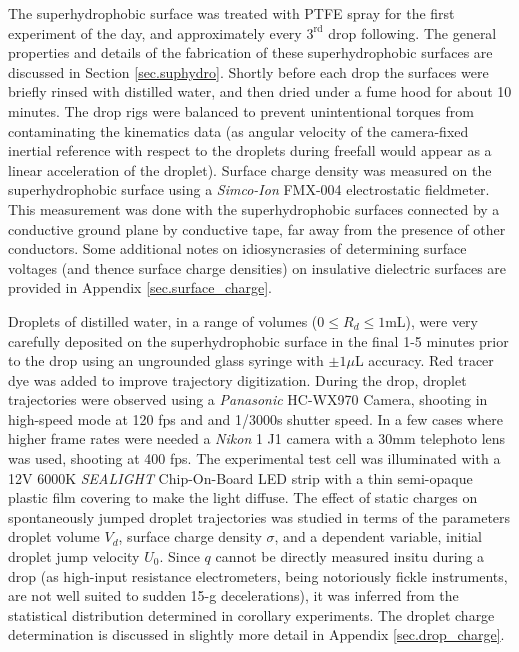 \documentclass[a4paper, 12pt]{article}
\begin{document}
The superhydrophobic surface was treated with PTFE spray for the first experiment of the day, and approximately every $3^{\mbox{rd}}$ drop following. The general properties and details of the fabrication of these superhydrophobic surfaces are discussed in Section \ref{sec.suphydro}. Shortly before each drop the surfaces were briefly rinsed with distilled water, and then dried under a fume hood for about 10 minutes. The drop rigs were balanced to prevent unintentional torques from contaminating the kinematics data (as angular velocity of the camera-fixed inertial reference with respect to the droplets during freefall would appear as a linear acceleration of the droplet). Surface charge density was measured on the superhydrophobic surface using a \emph{Simco-Ion} FMX-004 electrostatic fieldmeter. This measurement was done with the superhydrophobic surfaces connected by a conductive ground plane by conductive tape, far away from the presence of other conductors. Some additional notes on idiosyncrasies of determining surface voltages (and thence surface charge densities) on insulative dielectric surfaces are provided in Appendix \ref{sec.surface_charge}.

Droplets of distilled water, in a range of volumes ($0 \leq R_d \leq 1$mL), were very carefully deposited on the superhydrophobic surface in the final 1-5 minutes prior to the drop using an ungrounded glass syringe with $\pm 1\mu$L accuracy. Red tracer dye was added to improve trajectory digitization. During the drop, droplet trajectories were observed using a \emph{Panasonic} HC-WX970 Camera, shooting in high-speed mode at 120 fps and and 1/3000s shutter speed. In a few cases where higher frame rates were needed a \emph{Nikon} 1 J1 camera with a 30mm telephoto lens was used, shooting at 400 fps. The experimental test cell was illuminated with a 12V 6000K \emph{SEALIGHT} Chip-On-Board LED strip with a thin semi-opaque plastic film covering to make the light diffuse. The effect of static charges on spontaneously jumped droplet trajectories was studied in terms of the parameters droplet volume $V_d$, surface charge density $\sigma$, and a dependent variable, initial droplet jump velocity $U_0$. Since $q$ cannot be directly measured insitu during a drop (as high-input resistance electrometers, being notoriously fickle instruments, are not well suited to sudden 15-g decelerations), it was inferred from the statistical distribution determined in corollary experiments. The droplet charge determination is discussed in slightly more detail in Appendix \ref{sec.drop_charge}.
 
\end{document}
